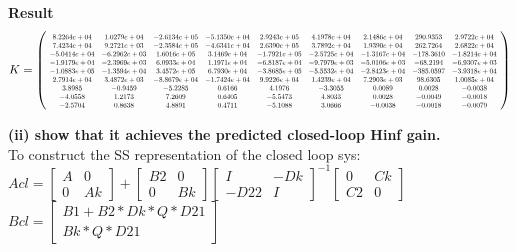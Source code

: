 \documentclass[10pt,a4paper]{article}
\newcommand\scalemath[2]{\scalebox{#1}{\mbox{\ensuremath{\displaystyle #2}}}}
\begin{document}
\begin{tcolorbox}
\textbf{Result}
$$K=\left(
\scalemath{0.6}{
\begin{array}{ccccccccc} 8.2264e+04 & 1.0279e+04 & -2.6134e+05 & -5.1350e+04 & 2.9243e+05 & 4.1978e+04 & 2.1486e+04 & 290.9353 & 2.9722e+04\\ 7.4234e+04 & 9.2721e+03 & -2.3584e+05 & -4.6341e+04 & 2.6390e+05 & 3.7892e+04 & 1.9390e+04 & 262.7264 & 2.6822e+04\\ -5.0414e+04 & -6.2962e+03 & 1.6016e+05 & 3.1469e+04 & -1.7921e+05 & -2.5725e+04 & -1.3167e+04 & -178.3610 & -1.8214e+04\\ -1.9179e+04 & -2.3969e+03 & 6.0933e+04 & 1.1971e+04 & -6.8187e+04 & -9.7979e+03 & -5.0106e+03 & -68.2194 & -6.9307e+03\\ -1.0883e+05 & -1.3594e+04 & 3.4572e+05 & 6.7930e+04 & -3.8685e+05 & -5.5532e+04 & -2.8423e+04 & -385.0597 & -3.9318e+04\\ 2.7914e+04 & 3.4872e+03 & -8.8679e+04 & -1.7424e+04 & 9.9226e+04 & 1.4239e+04 & 7.2903e+03 & 98.6305 & 1.0085e+04\\ 3.8985 & -0.9459 & -5.2285 & 0.6166 & 4.1976 & -3.3055 & 0.0089 & 0.0028 & -0.0038\\ -4.0558 & 1.2173 & 7.2609 & 0.6405 & -5.5473 & 4.8033 & 0.0028 & -0.0049 & -0.0018\\ -2.5704 & 0.8638 & 4.8891 & 0.4711 & -5.1088 & 3.0666 & -0.0038 & -0.0018 & -0.0079 
\end{array}
}
\right)
$$

\textbf{(ii) show that it achieves the predicted closed-loop Hinf gain.}\\

To construct the SS representation of the closed loop sys:\\
$Acl =\begin{bmatrix}
A& 0\\
0& Ak 
\end{bmatrix} +\begin{bmatrix}
B2& 0\\0 &Bk
\end{bmatrix}\begin{bmatrix}
I& -Dk\\ -D22& I
\end{bmatrix}^{-1}\begin{bmatrix}
0& Ck\\ C2&0
\end{bmatrix}
$\\

$Bcl=\begin{bmatrix}
B1+ B2*Dk*Q*D21\\
      Bk*Q*D21
\end{bmatrix}
$\\



\end{tcolorbox}
\end{document}
